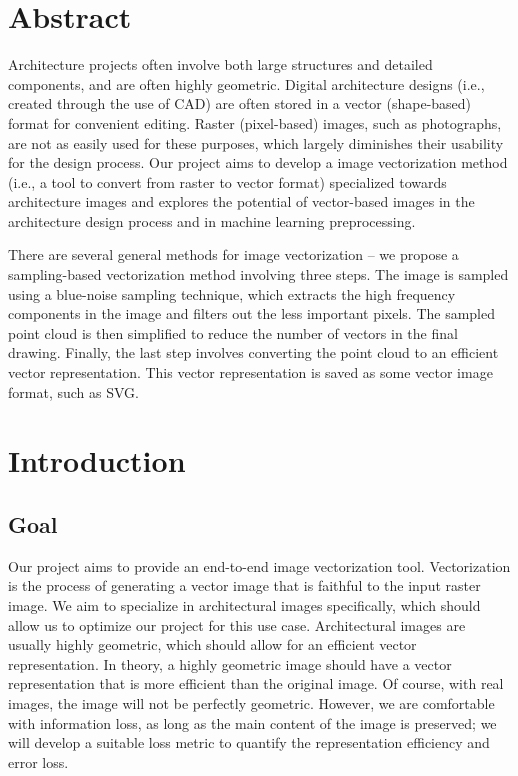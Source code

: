 \documentclass{article}
\begin{document}

\clearpage

\doublespacing
\tableofcontents
\clearpage

\section{Abstract}

Architecture projects often involve both large structures and detailed components, and are often highly geometric. Digital architecture designs (i.e., created through the use of CAD) are often stored in a vector (shape-based) format for convenient editing. Raster (pixel-based) images, such as photographs, are not as easily used for these purposes, which largely diminishes their usability for the design process. Our project aims to develop a image vectorization method (i.e., a tool to convert from raster to vector format) specialized towards architecture images and explores the potential of vector-based images in the architecture design process and in machine learning preprocessing.

There are several general methods for image vectorization -- we propose a sampling-based vectorization method involving three steps. The image is sampled using a blue-noise sampling technique, which extracts the high frequency components in the image and filters out the less important pixels. The sampled point cloud is then simplified to reduce the number of vectors in the final drawing. Finally, the last step involves converting the point cloud to an efficient vector representation. This vector representation is saved as some vector image format, such as SVG.

\clearpage
\section{Introduction}

\subsection{Goal}

Our project aims to provide an end-to-end image vectorization tool. Vectorization is the process of generating a vector image that is faithful to the input raster image. We aim to specialize in architectural images specifically, which should allow us to optimize our project for this use case. Architectural images are usually highly geometric, which should allow for an efficient vector representation. In theory, a highly geometric image should have a vector representation that is more efficient than the original image. Of course, with real images, the image will not be perfectly geometric. However, we are comfortable with information loss, as long as the main content of the image is preserved; we will develop a suitable loss metric to quantify the representation efficiency and error loss.
\end{document}
